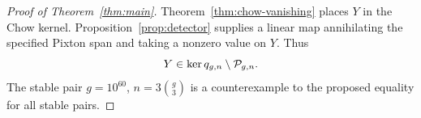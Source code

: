 \begin{proof}[Proof of Theorem~\ref{thm:main}]
Theorem~\ref{thm:chow-vanishing} places \(Y\) in the Chow kernel.
Proposition~\ref{prop:detector} supplies a linear map annihilating the
specified Pixton span and taking a nonzero value on \(Y\).  Thus
\[
 Y\in\ker q_{g,n}\setminus\mathcal P_{g,n}.
\]
The stable pair \(g=10^{60}\), \(n=3\binom g3\) is a counterexample to
the proposed equality for all stable pairs.
\end{proof}
